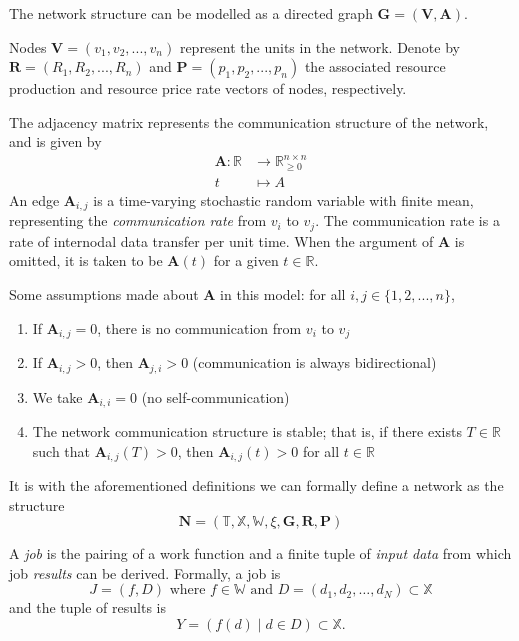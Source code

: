 \documentclass[../mthe-493-project-proposal.tex]{subfiles}
\begin{document}
    The network structure can be modelled as a directed graph $\mathbf{G} = (\mathbf{V}, \mathbf{A})$.

    Nodes $\mathbf{V} = (v_1, v_2, ..., v_n)$ represent the units in the network. Denote by $\mathbf{R} = (R_1, R_2, ..., R_n)$ and $\mathbf{P} = (p_1, p_2, ..., p_n)$ the associated resource production and resource price rate vectors of nodes, respectively.
    
    The adjacency matrix represents the communication structure of the network, and is given by
    \begin{align*}
        \mathbf{A} \colon \mathbb{R} &\to \mathbb{R}^{n \times n}_{\geq 0} \\
        t                            &\mapsto A
    \end{align*}
    An edge $\mathbf{A}_{i,j}$ is a time-varying stochastic random variable with finite mean, representing the \textit{communication rate} from $v_i$ to $v_j$. The communication rate is a rate of internodal data transfer per unit time. When the argument of $\mathbf{A}$ is omitted, it is taken to be $\mathbf{A}(t)$ for a given $t \in \mathbb{R}$.

    Some assumptions made about $\mathbf{A}$ in this model: for all $i, j \in \{1, 2, ..., n\}$,
    \begin{enumerate}
        \item If $\mathbf{A}_{i,j} = 0$, there is no communication from $v_i$ to $v_j$
        \item If $\mathbf{A}_{i,j} > 0$, then $\mathbf{A}_{j,i} > 0$ (communication is always bidirectional)
        \item We take $\mathbf{A}_{i,i} = 0$ (no self-communication)
        \item The network communication structure is stable; that is, if there exists $T \in \mathbb{R}$ such that $\mathbf{A}_{i,j}(T) > 0$, then $\mathbf{A}_{i,j}(t) > 0$ for all $t \in \mathbb{R}$
    \end{enumerate}
    
    It is with the aforementioned definitions we can formally define a network as the structure
    \begin{equation}
    \label{eq:network}
        \mathbf{N} = (\mathbb{T}, \mathbb{X}, \mathbb{W}, \xi, \mathbf{G}, \mathbf{R}, \mathbf{P})
    \end{equation}

    A \textit{job} is the pairing of a work function and a finite tuple of \textit{input data} from which job \textit{results} can be derived. Formally, a job is
    \begin{equation*}
        J = (f, D) \text{ where } f \in \mathbb{W} \text{ and } D = (d_1, d_2, \dotsc, d_N) \subset \mathbb{X}
    \end{equation*}
    and the tuple of results is
    \begin{equation*}
        Y = (f(d) \mid d \in D) \subset \mathbb{X}.
    \end{equation*}
\end{document}
